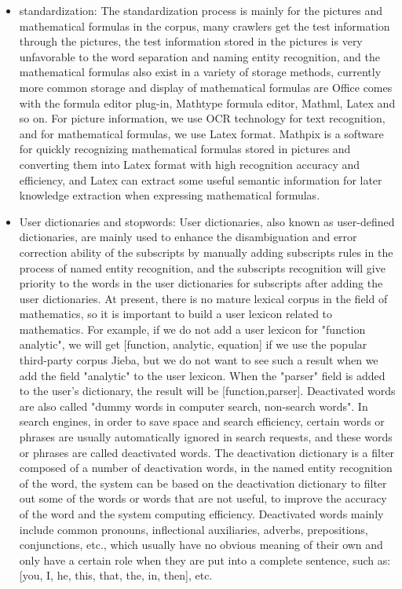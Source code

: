 \begin{itemize}
	\item standardization: The standardization process is mainly for the pictures and mathematical formulas in the corpus, many crawlers get the test information through the pictures, the test information stored in the pictures is very unfavorable to the word separation and naming entity recognition, and the mathematical formulas also exist in a variety of storage methods, currently more common storage and display of mathematical formulas are Office comes with the formula editor plug-in, Mathtype formula editor, Mathml, Latex and so on. For picture information, we use OCR technology for text recognition, and for mathematical formulas, we use Latex format. Mathpix is a software for quickly recognizing mathematical formulas stored in pictures and converting them into Latex format with high recognition accuracy and efficiency, and Latex can extract some useful semantic information for later knowledge extraction when expressing mathematical formulas.
	\item User dictionaries and stopwords: User dictionaries, also known as user-defined dictionaries, are mainly used to enhance the disambiguation and error correction ability of the subscripts by manually adding subscripts rules in the process of named entity recognition, and the subscripts recognition will give priority to the words in the user dictionaries for subscripts after adding the user dictionaries. At present, there is no mature lexical corpus in the field of mathematics, so it is important to build a user lexicon related to mathematics. For example, if we do not add a user lexicon for "function analytic", we will get [function, analytic, equation] if we use the popular third-party corpus Jieba, but we do not want to see such a result when we add the field "analytic" to the user lexicon. When the "parser" field is added to the user's dictionary, the result will be [function,parser]. Deactivated words are also called "dummy words in computer search, non-search words". In search engines, in order to save space and search efficiency, certain words or phrases are usually automatically ignored in search requests, and these words or phrases are called deactivated words. The deactivation dictionary is a filter composed of a number of deactivation words, in the named entity recognition of the word, the system can be based on the deactivation dictionary to filter out some of the words or words that are not useful, to improve the accuracy of the word and the system computing efficiency. Deactivated words mainly include common pronouns, inflectional auxiliaries, adverbs, prepositions, conjunctions, etc., which usually have no obvious meaning of their own and only have a certain role when they are put into a complete sentence, such as: [you, I, he, this, that, the, in, then], etc.

\end{itemize}
